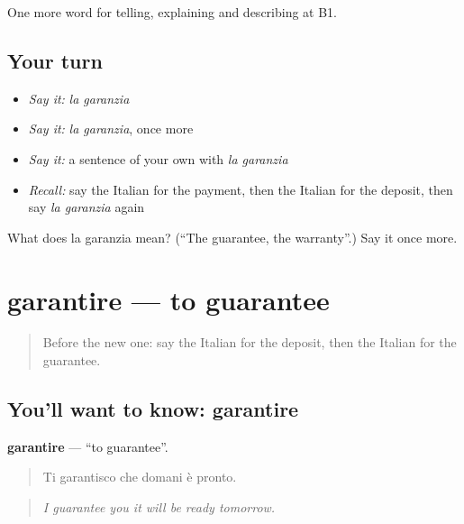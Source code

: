 \begin{grammarlens}[title={What you've built}]
One more word for telling, explaining and describing at B1.
\end{grammarlens}

\subsection*{Your turn}
\begin{itemize}
\raggedright
  \item \emph{Say it:} \emph{la garanzia}
  \item \emph{Say it:} \emph{la garanzia}, once more
  \item \emph{Say it:} a sentence of your own with \emph{la garanzia}
  \item \emph{Recall:} say the Italian for the payment, then the Italian for the deposit, then say \emph{la garanzia} again
\end{itemize}

\begin{tcolorbox}[breakable,colback=teal!4,colframe=teal!35!black,title={Before you move on}]
What does la garanzia mean? (\textquotedblleft{}The guarantee, the warranty\textquotedblright{}.) Say it once more.
\end{tcolorbox}
\section[garantire]{garantire — to guarantee}

\label{lesson:IT-C397-garantire}



\begin{quote}
Before the new one: say the Italian for the deposit, then the Italian for the guarantee.
\end{quote}

\subsection*{You'll want to know: garantire}
\textbf{garantire} — \textquotedblleft{}to guarantee\textquotedblright{}.

\begin{quote}
Ti garantisco che domani è pronto.
\end{quote}

\begin{quote}
\emph{I guarantee you it will be ready tomorrow.}
\end{quote}

